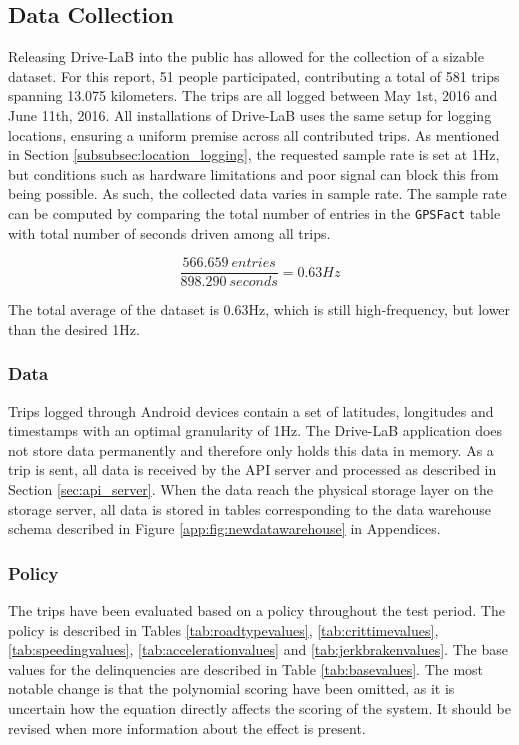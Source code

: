 \subsection{Data Collection}\label{sec:datacollection}
Releasing Drive-LaB into the public has allowed for the collection of a sizable dataset. For this report, 51 people participated, contributing a total of 581 trips spanning 13.075 kilometers. The trips are all logged between May 1st, 2016 and June 11th, 2016. All installations of Drive-LaB uses the same setup for logging locations, ensuring a uniform premise across all contributed trips. As mentioned in Section \ref{subsubsec:location_logging}, the requested sample rate is set at 1Hz, but conditions such as hardware limitations and poor signal can block this from being possible. As such, the collected data varies in sample rate. The sample rate can be computed by comparing the total number of entries in the \texttt{GPSFact} table with total number of seconds driven among all trips.  

\begin{equation}
\frac{566.659 \ entries}{898.290 \ seconds}= 0.63Hz
\end{equation}

The total average of the dataset is 0.63Hz, which is still high-frequency, but lower than the desired 1Hz.

\subsubsection{Data}\label{subsec:data}
Trips logged through Android devices contain a set of latitudes, longitudes and timestamps with an optimal granularity of 1Hz. The Drive-LaB application does not store data permanently and therefore only holds this data in memory. As a trip is sent, all data is received by the API server and processed as described in Section \ref{sec:api_server}. When the data reach the physical storage layer on the storage server, all data is stored in tables corresponding to the data warehouse schema described in Figure \ref{app:fig:newdatawarehouse} in Appendices. 

\subsubsection{Policy}\label{subsec:policy}
The trips have been evaluated based on a policy throughout the test period. The policy is described in Tables \ref{tab:roadtypevalues}, \ref{tab:crittimevalues}, \ref{tab:speedingvalues}, \ref{tab:accelerationvalues} and \ref{tab:jerkbrakenvalues}. The base values for the delinquencies are described in Table \ref{tab:basevalues}. The most notable change is that the polynomial scoring have been omitted, as it is uncertain how the equation directly affects the scoring of the system. It should be revised when more information about the effect is present.

